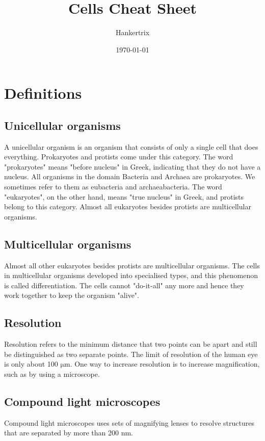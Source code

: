 \documentclass[11pt]{article}
\author{Hankertrix}
\date{\today}
\title{Cells Cheat Sheet}
\begin{document}
\maketitle
\setcounter{tocdepth}{2}
\tableofcontents

\newpage

\section{Definitions}
\label{sec:org2bdd88a}

\subsection{Unicellular organisms}
\label{sec:orgc88e936}
A unicellular organism is an organism that consists of only a single cell that does everything. Prokaryotes and protists come under this category. The word "prokaryotes" means "before nucleus" in Greek, indicating that they do not have a nucleus. All organisms in the domain Bacteria and Archaea are prokaryotes. We sometimes refer to them as eubacteria and archaeabacteria. The word "eukaryotes", on the other hand, means "true nucleus" in Greek, and protists belong to this category. Almost all eukaryotes besides protists are multicellular organisms.

\subsection{Multicellular organisms}
\label{sec:org721cf76}
Almost all other eukaryotes besides protists are multicellular organisms. The cells in multicellular organisms developed into specialised types, and this phenomenon is called differentiation. The cells cannot "do-it-all" any more and hence they work together to keep the organism "alive".

\subsection{Resolution}
\label{sec:org87263df}
Resolution refers to the minimum distance that two points can be apart and still be distinguished as two separate points. The limit of resolution of the human eye is only about 100 \(\unit{\micro\metre}\). One way to increase resolution is to increase magnification, such as by using a microscope.

\subsection{Compound light microscopes}
\label{sec:org6709044}
Compound light microscopes uses sets of magnifying lenses to resolve structures that are separated by more than 200 \(\unit{\nano\metre}\).
\end{document}
